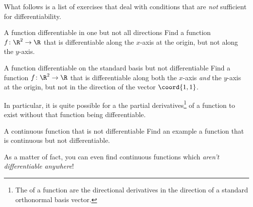 What follows is a list of exercises that deal with conditions that are \emph{not} sufficient for differentiability.
\begin{exr}{A function differentiable in one but not all directions}{}
Find a function $f\colon \R ^2\rightarrow \R$ that is differentiable along the $x$-axis at the origin, but not along the $y$-axis.
\end{exr}
\begin{exr}{A function differentiable on the standard basis but not differentiable}{}
Find a function $f\colon \R ^2\rightarrow \R$ that is differentiable along both the $x$-axis \emph{and} the $y$-axis at the origin, but not in the direction of the vector $\coord{1,1}$.
\begin{rmk}
In particular, it is quite possible for a the partial derivatives\footnote{The  of a function are the directional derivatives in the direction of a standard orthonormal basis vector.} of a function to exist without that function being differentiable.
\end{rmk}
\end{exr}
\begin{exr}{A continuous function that is not differentiable}{}
Find an example a function that is continuous but not differentiable.
\end{exr}
As a matter of fact, you can even find continuous functions which \emph{aren't differentiable anywhere}!
